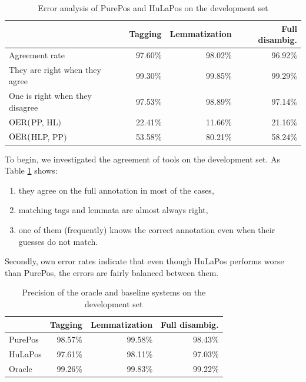 \begin{table}[H]
\centering
\caption{Error analysis of PurePos and HuLaPos on the development set}\label{tab:comb-disambig-comp}
\begin{tabular}{l r r r}
\hline
& Tagging & Lemmatization & Full disambig. \\
\hline
Agreement rate & 97.60\% & 98.02\% & 96.92\% \\
They are right when they agree & 99.30\% & 99.85\% & 99.29\% \\
One is right when they disagree & 97.53\% & 98.89\% & 97.14\% \\
$\operatorname{OER}($PP, HL$)$ & 22.41\% & 11.66\% & 21.16\% \\
$\operatorname{OER}($HLP, PP$)$ & 53.58\% & 80.21\% & 58.24\% \\
\hline
\end{tabular}
\end{table}

To begin, we investigated the agreement of tools on the development set.
As Table \ref{tab:comb-disambig-comp} shows:
\begin{enumerate}
 \item they agree on the full annotation in most of the cases,
 \item matching tags and lemmata are almost always right, 
 \item one of them (frequently) knows the correct annotation even when their guesses do not match.
\end{enumerate}

Secondly, own error rates indicate that even though HuLaPos performs worse than PurePos, the errors are fairly balanced between them. 

\begin{table}[H]
\centering
\caption{Precision of the oracle and baseline systems on the development set}\label{tab:comb-disambig-acc}
\begin{tabular}{l r r r}
\hline
& Tagging & Lemmatization & Full disambig. \\
\hline
PurePos & 98.57\% & 99.58\% & 98.43\% \\
HuLaPos & 97.61\% & 98.11\% & 97.03\% \\
Oracle & 99.26\% & 99.83\% & 99.22\% \\
\hline
\end{tabular}
\end{table}

